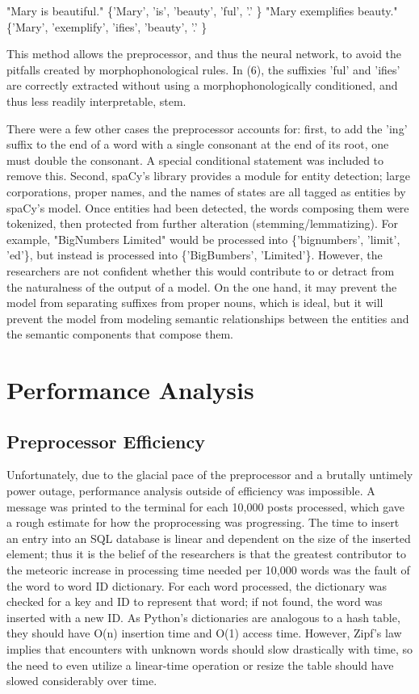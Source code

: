\documentclass[11pt,twocolumn]{article}
\begin{document}
\begin{exe}
		\ex
			\begin{xlist}
				\ex "Mary is beautiful."
				\ex \{'Mary', 'is', 'beauty', 'ful', '.' \}
				\ex "Mary exemplifies beauty."
				\ex \{'Mary', 'exemplify', 'ifies', 'beauty', '.' \}
			\end{xlist}
\end{exe}
This method allows the preprocessor, and thus the neural network, to avoid the pitfalls created by morphophonological rules. In (6), the suffixies 'ful' and 'ifies' are correctly extracted without using a morphophonologically conditioned, and thus less readily interpretable, stem. 
\par There were a few other cases the preprocessor accounts for: first, to add the 'ing' suffix to the end of a word with a single consonant at the end of its root, one must double the consonant. A special conditional statement was included to remove this.
Second, spaCy's library provides a module for entity detection; large corporations, proper names, and the names of states are all tagged as entities by spaCy's model. Once entities had been detected, the words composing them were tokenized, then protected from further alteration (stemming/lemmatizing). For example, "BigNumbers Limited" would be processed into \{'bignumbers', 'limit', 'ed'\}, but instead is processed into \{'BigBumbers', 'Limited'\}. However, the researchers are not confident whether this would contribute to or detract from the naturalness of the output of a model. On the one hand, it may prevent the model from separating suffixes from proper nouns, which is ideal, but it will prevent the model from modeling semantic relationships between the entities and the semantic components that compose them.   
 
\section{Performance Analysis}
\subsection*{Preprocessor Efficiency}
Unfortunately, due to the glacial pace of the preprocessor and a brutally untimely power outage, performance analysis outside of efficiency was impossible. A message was printed to the terminal for each 10,000 posts processed, which gave a rough estimate for how the proprocessing was progressing. The time to insert an entry into an SQL database is linear and dependent on the size of the inserted element; thus it is the belief of the researchers is that the greatest contributor to the meteoric increase in processing time needed per 10,000 words was the fault of the word to word ID dictionary. For each word processed, the dictionary was checked for a key and ID to represent that word; if not found, the word was inserted with a new ID. As Python's dictionaries are analogous to a hash table, they should have O(n) insertion time and O(1) access time. However, Zipf's law implies that encounters with unknown words should slow drastically with time, so the need to even utilize a linear-time operation or resize the table should have slowed considerably over time. 
\end{document}
